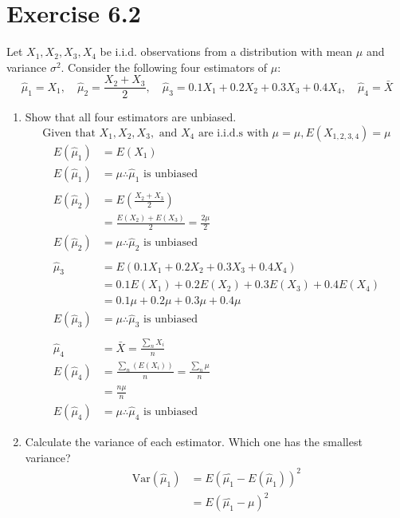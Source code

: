 \documentclass{article}
\newcommand{\var}{\text{Var}}
\begin{document}
	\section*{Exercise 6.2}
	Let $X_1, X_2, X_3,  X_4$ be i.i.d. observations from a distribution with mean $\mu$ and variance $\sigma^2$. Consider the following four estimators of $\mu$:
	\[ \hat{\mu}_1 = X_1, \quad \hat{\mu}_2 = \frac{X_2 + X_3}{2}, \quad \hat{\mu}_3 = 0.1X_1 + 0.2 X_2 + 0.3 X_3 + 0.4 X_4, \quad \hat{\mu}_4 = \bar{X} \]
	
	\begin{enumerate}[\quad(a)]
		\item Show that all four estimators are unbiased.
		\[ \text{Given that } X_1, X_2, X_3, \text{ and } X_4 \text{ are i.i.d.s with } \mu = \mu, E(X_{1,2,3,4}) = \mu \]
		\begin{align*}
			E(\hat{\mu}_1) &= E(X_1) \\
			E(\hat{\mu}_1) &= \mu \therefore \hat{\mu}_1 \text{ is unbiased}\\\\
			E(\hat{\mu}_2) &= E\left(\frac{X_2 + X_3}{2}\right)\\
			&= \frac{E(X_2) + E(X_3)}{2} = \frac{2\mu}{2}\\
			E(\hat{\mu}_2) &= \mu \therefore \hat{\mu}_2 \text{ is unbiased}\\\\
			\hat{\mu}_3 &= E(0.1X_1 + 0.2 X_2 + 0.3 X_3 + 0.4 X_4) \\
			&= 0.1E(X_1) + 0.2 E(X_2) + 0.3 E(X_3) + 0.4 E(X_4)\\
			&= 0.1 \mu + 0.2 \mu + 0.3 \mu + 0.4\mu\\
			E(\hat{\mu}_3) &= \mu \therefore \hat{\mu}_3 \text{ is unbiased}\\\\
			\hat{\mu}_4 &= \bar{X} = \frac{\sum_n X_i}{n}\\
			E(\hat{\mu}_4) &= \frac{\sum_n (E(X_i))}{n} = \frac{\sum_n \mu}{n}\\
			&= \frac{n\mu}{n} \\
			E(\hat{\mu}_4) &= \mu \therefore \hat{\mu}_4 \text{ is unbiased}
		\end{align*}
		\item Calculate the variance of each estimator. Which one has the smallest variance?
		\begin{align*}
			\var(\hat{\mu}_1) &= E(\hat{\mu_1} - E(\hat{\mu}_1))^2 \\
			&= E(\hat{\mu_1} - \mu)^2 \\

\end{align*}
\end{enumerate}
\end{document}
